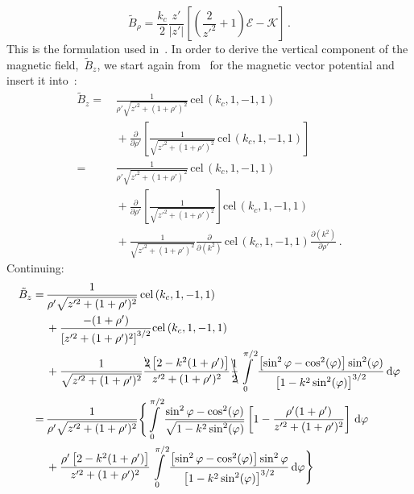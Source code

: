 \begin{equation}
 \tilde{B}_\rho = \frac{k_c}{2} \frac{z'}{|z'|} \left[ \left( \frac{2}{z'^2} + 1 \right) \mathcal{E} - \mathcal{K} \right] \, .
\end{equation}
This is the formulation used in~.
In order to derive the vertical component of the magnetic field,~$\tilde{B}_z$,
we start again from~ for the magnetic vector potential
and insert it into~:
\begin{align}
 \tilde{B}_z
 =&\,   \frac{1}{\rho' \sqrt{z'^2 + (1 + \rho')^2}} \,\textrm{cel}\,(k_c, 1, -1, 1) \nonumber \\
 ~&\, + \frac{\partial}{\partial \rho'} \left[ \frac{1}{\sqrt{z'^2 + (1 + \rho')^2}} \,\textrm{cel}\,(k_c, 1, -1, 1) \right] \nonumber \\
 =&\,   \frac{1}{\rho' \sqrt{z'^2 + (1 + \rho')^2}} \,\textrm{cel}\,(k_c, 1, -1, 1) \nonumber \\
 ~&\, + \frac{\partial}{\partial \rho'} \left[ \frac{1}{\sqrt{z'^2 + (1 + \rho')^2}} \right] \textrm{cel}\,(k_c, 1, -1, 1) \nonumber \\
 ~&\, + \frac{1}{\sqrt{z'^2 + (1 + \rho')^2}} \frac{\partial}{\partial (k^2)} \,\textrm{cel}\,(k_c, 1, -1, 1) \frac{\partial (k^2)}{\partial \rho'} \, .
\end{align}
Continuing:
\begin{align}
 \tilde{B}_z
 =&\,   \frac{1}{\rho' \sqrt{z'^2 + (1 + \rho')^2}} \,\textrm{cel}\,(k_c, 1, -1, 1) \nonumber \\
 ~&\, + \frac{-(1 + \rho')}{\left[z'^2 + (1 + \rho')^2\right]^{3/2}} \textrm{cel}\,(k_c, 1, -1, 1) \nonumber \\
 ~&\, + \frac{1}{\sqrt{z'^2 + (1 + \rho')^2}}
          \frac{\bcancel{2} \left[2 - k^2(1+\rho')\right]}{z'^2 + (1 + \rho')^2}
          \bcancel{\frac{1}{2}} \int\limits_0^{\pi/2} \frac{\left[\sin^2{\varphi} - \cos^2(\varphi)\right]\sin^2(\varphi)}{\left[1 - k^2 \sin^2(\varphi)\right]^{3/2}} \,\mathrm{d}\varphi \nonumber \\
 =&\, \frac{1}{\rho' \sqrt{z'^2 + (1 + \rho')^2}} \Biggl\{
        \int\limits_0^{\pi/2}
          \frac{\sin^2{\varphi} - \cos^2(\varphi)}{\sqrt{1 - k^2 \sin^2(\varphi)}}
          \left[1 - \frac{\rho'(1 + \rho')}{z'^2 + (1 + \rho')^2} \right] \,\mathrm{d}\varphi \nonumber \\
 ~&\, + \frac{\rho'\left[2 - k^2(1+\rho')\right]}{z'^2 + (1 + \rho')^2}
        \int\limits_0^{\pi/2}
          \frac{\left[\sin^2{\varphi} - \cos^2(\varphi)\right]\sin^2{\varphi}}{\left[1 - k^2 \sin^2(\varphi)\right]^{3/2}} \,\mathrm{d}\varphi \Biggr\}
\end{align}
